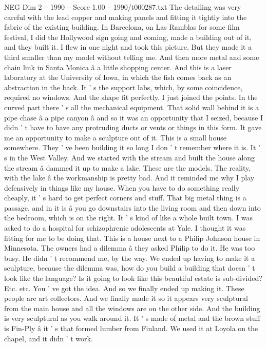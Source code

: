 \begin{textsample}{NEG Dim 2 – 1990 – Score 1.00 – 1990/t000287.txt}
The detailing was very careful with the lead copper and making panels and fitting it tightly into the fabric of the existing building.
In Barcelona, on Las Ramblas for some film festival, I did the Hollywood sign going and coming, made a building out of it, and they built it.
I flew in one night and took this picture.
But they made it a third smaller than my model without telling me.
And then more metal and some chain link in Santa Monica â a little shopping center.
And this is a laser laboratory at the University of Iowa, in which the fish comes back as an abstraction in the back.
It ' s the support labs, which, by some coincidence, required no windows.
And the shape fit perfectly.
I just joined the points.
In the curved part there ' s all the mechanical equipment.
That solid wall behind it is a pipe chase â a pipe canyon â and so it was an opportunity that I seized, because I didn ' t have to have any protruding ducts or vents or things in this form.
It gave me an opportunity to make a sculpture out of it.
This is a small house somewhere.
They ' ve been building it so long I don ' t remember where it is.
It ' s in the West Valley.
And we started with the stream and built the house along the stream â dammed it up to make a lake.
These are the models.
The reality, with the lake â the workmanship is pretty bad.
And it reminded me why I play defensively in things like my house.
When you have to do something really cheaply, it ' s hard to get perfect corners and stuff.
That big metal thing is a passage, and in it is â you go downstairs into the living room and then down into the bedroom, which is on the right.
It ' s kind of like a whole built town.
I was asked to do a hospital for schizophrenic adolescents at Yale.
I thought it was fitting for me to be doing that.
This is a house next to a Philip Johnson house in Minnesota.
The owners had a dilemma â they asked Philip to do it.
He was too busy.
He didn ' t recommend me, by the way.
We ended up having to make it a sculpture, because the dilemma was, how do you build a building that doesn ' t look like the language?
Is it going to look like this beautiful estate is sub-divided?
Etc. etc.
You ' ve got the idea.
And so we finally ended up making it.
These people are art collectors.
And we finally made it so it appears very sculptural from the main house and all the windows are on the other side.
And the building is very sculptural as you walk around it.
It ' s made of metal and the brown stuff is Fin-Ply â it ' s that formed lumber from Finland.
We used it at Loyola on the chapel, and it didn ' t work.

\end{textsample}
